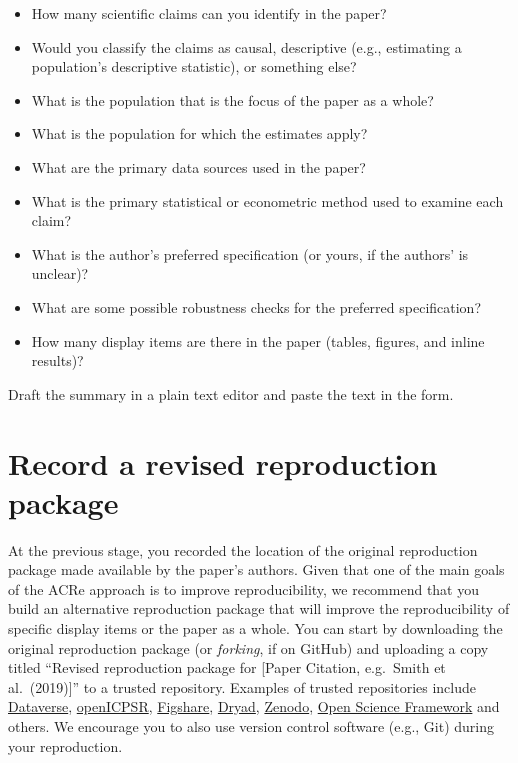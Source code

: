 \documentclass[
  openany]{book}
\providecommand{\tightlist}{%
  \setlength{\itemsep}{0pt}\setlength{\parskip}{0pt}}
\begin{document}
\begin{itemize}
\tightlist
\item
  How many scientific claims can you identify in the paper?
\item
  Would you classify the claims as causal, descriptive (e.g., estimating a population's descriptive statistic), or something else?\\
\item
  What is the population that is the focus of the paper as a whole?\\
\item
  What is the population for which the estimates apply?\\
\item
  What are the primary data sources used in the paper?\\
\item
  What is the primary statistical or econometric method used to examine each claim?\\
\item
  What is the author's preferred specification (or yours, if the authors' is unclear)?\\
\item
  What are some possible robustness checks for the preferred specification?\\
\item
  How many display items are there in the paper (tables, figures, and inline results)?
\end{itemize}

Draft the summary in a plain text editor and paste the text in the form.

\hypertarget{record-a-revised-reproduction-package}{%
\section{Record a revised reproduction package}\label{record-a-revised-reproduction-package}}

At the previous stage, you recorded the location of the original reproduction package made available by the paper's authors. Given that one of the main goals of the ACRe approach is to improve reproducibility, we recommend that you build an alternative reproduction package that will improve the reproducibility of specific display items or the paper as a whole.
You can start by downloading the original reproduction package (or \emph{forking}, if on GitHub) and uploading a copy titled ``Revised reproduction package for {[}Paper Citation, e.g.~Smith et al.~(2019){]}'' to a trusted repository. Examples of trusted repositories include \href{https://dataverse.org/}{Dataverse}, \href{https://www.openicpsr.org/openicpsr/}{openICPSR}, \href{https://figshare.com}{Figshare}, \href{https://datadryad.org/stash}{Dryad}, \href{https://about.zenodo.org/}{Zenodo}, \href{osf.io/}{Open Science Framework} and others. We encourage you to also use version control software (e.g., Git) during your reproduction.
\end{document}
